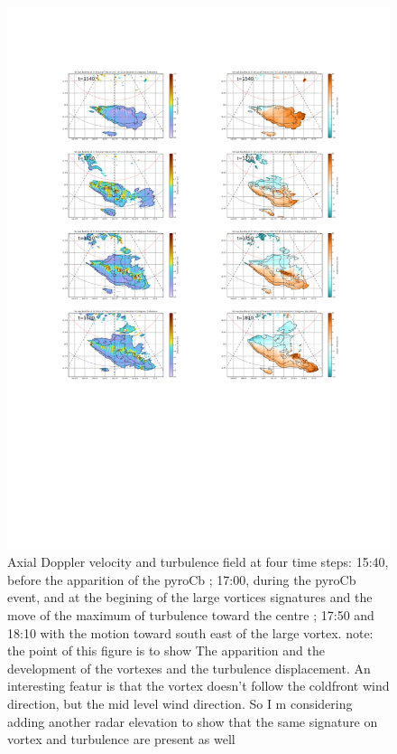 \documentclass[12pt]{article}
\begin{document}
\begin{figure}[position]
   \caption{\label{tur_vel} Axial Doppler velocity and turbulence field at four time steps: 15:40, before the apparition of the pyroCb ; 17:00, during the pyroCb event, and at the begining of the large vortices signatures and the move of the maximum of turbulence toward the centre ; 17:50 and 18:10 with the motion toward south east of the large vortex. {\color{red} note: the point of this figure is to show The apparition and the development of the vortexes and the turbulence displacement. An interesting featur is that the vortex doesn't follow the coldfront wind direction, but the mid level wind direction. So I m considering adding another radar elevation to show that the same signature on vortex and turbulence are present as well} }
   \includegraphics[width=\textwidth]{../figures/vel_turb.png}
\end{figure}
\end{document}

